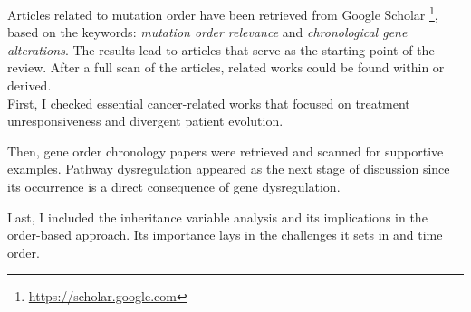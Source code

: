 Articles related to mutation order have been retrieved from Google Scholar \footnote{\url{https://scholar.google.com}}, based on the keywords: \emph{mutation order relevance} and \emph{chronological gene alterations}. The results lead to articles that serve as the starting point of the review. After a full scan of the articles, related works could be found within or derived.
\\

First, I checked essential cancer-related works that focused on treatment unresponsiveness and divergent patient evolution.

Then, gene order chronology papers were retrieved and scanned for supportive examples. Pathway dysregulation appeared as the next stage of discussion since its occurrence is a direct consequence of gene dysregulation.

Last, I included the inheritance variable analysis and its implications in the order-based approach. Its importance lays in the challenges it sets in and time order.